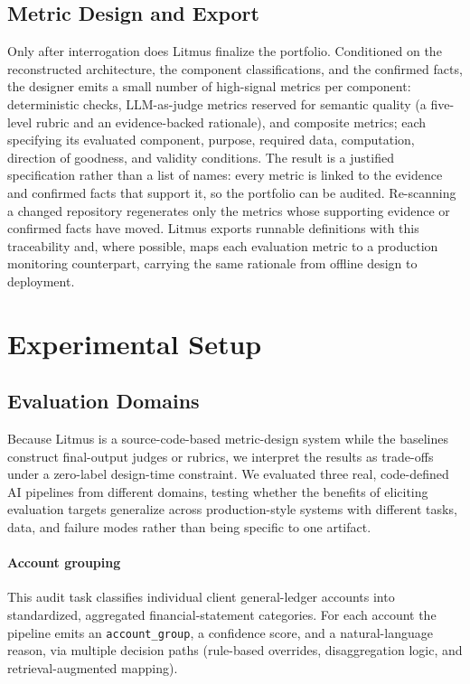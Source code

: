 \documentclass[11pt]{article}
\begin{document}
\subsection{Metric Design and Export}

Only after interrogation does Litmus finalize the portfolio. Conditioned on the reconstructed architecture, the component classifications, and the confirmed facts, the designer emits a small number of high-signal metrics per component: deterministic checks, LLM-as-judge metrics reserved for semantic quality (a five-level rubric and an evidence-backed rationale), and composite metrics; each specifying its evaluated component, purpose, required data, computation, direction of goodness, and validity conditions. The result is a justified specification rather than a list of names: every metric is linked to the evidence and confirmed facts that support it, so the portfolio can be audited. Re-scanning a changed repository regenerates only the metrics whose supporting evidence or confirmed facts have moved. Litmus exports runnable definitions with this traceability and, where possible, maps each evaluation metric to a production monitoring counterpart, carrying the same rationale from offline design to deployment.

\section{Experimental Setup}
\label{sec:setup}

\subsection{Evaluation Domains}
\label{sec:pipelines}

Because Litmus is a source-code-based metric-design system while the baselines construct final-output judges or rubrics, we interpret the results as trade-offs under a zero-label design-time constraint. We evaluated three real, code-defined AI pipelines from different domains, testing whether the benefits of eliciting evaluation targets generalize across production-style systems with different tasks, data, and failure modes rather than being specific to one artifact.

\paragraph{Account grouping} This audit task classifies individual client general-ledger accounts into standardized, aggregated financial-statement categories. For each account the pipeline emits an \texttt{account\_group}, a confidence score, and a natural-language reason, via multiple decision paths (rule-based overrides, disaggregation logic, and retrieval-augmented mapping).
\end{document}
